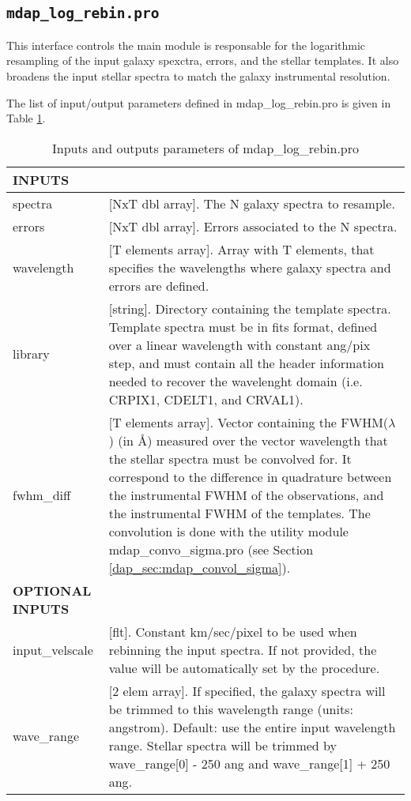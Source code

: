 \subsection{{\tt mdap\_log\_rebin.pro}}
\label{dap_sec:mdap_log_rebin}

This interface controls the main module is responsable for the
logarithmic resampling of the input galaxy spexctra, errors, and the
stellar templates. It also broadens the input stellar spectra to match
the galaxy instrumental resolution. 

The list of input/output parameters defined in mdap\_log\_rebin.pro is
given in Table \ref{dap_tab:mdap_log_rebin}.



\begin{center}
\begin{longtable}{p{2.7cm}| p{11.1cm}}
\caption{Inputs and outputs parameters of mdap\_log\_rebin.pro} \label{dap_tab:mdap_log_rebin} \\
\hline
\endfirsthead
\hline
\endhead
\hline
\endlastfoot
\hline
{\bf  INPUTS} &  \\
\hline
spectra   &   [NxT dbl array].  The N galaxy spectra to resample.\\
%
errors    &   [NxT dbl array].  Errors associated to the N spectra.\\
%
wavelength & [T elements array].     Array with T elements, that specifies the wavelengths where galaxy spectra and errors are defined.\\
%
library    &  [string].          Directory containing the template spectra. Template spectra must be in fits format, defined over a 
                             linear wavelength with constant ang/pix step, and must contain all the header information needed to  
                             recover the wavelenght domain (i.e. CRPIX1, CDELT1, and CRVAL1).\\
fwhm\_diff & [T elements array].  Vector containing the FWHM($\lambda$) (in \AA) measured over the vector wavelength that the stellar spectra must be
                               convolved for. It correspond to the difference in quadrature between the instrumental FWHM of the observations, 
                                 and the instrumental FWHM of the templates. The convolution is done with the utility module 
                                mdap\_convo\_sigma.pro (see Section \ref{dap_sec:mdap_convol_sigma}). \\
%
\hline
{\bf  OPTIONAL INPUTS} & \\
\hline
input\_velscale & [flt].    Constant km/sec/pixel to be used when rebinning the input spectra. If not provided, the value will be
                             automatically set by the procedure.\\
%
wave\_range  & [2 elem array].  If specified, the galaxy spectra will be trimmed to this wavelength range (units: angstrom). Default: 
                             use the entire input wavelength range. Stellar spectra will be trimmed by 
                             wave\_range[0] - 250 ang and wave\_range[1] + 250 ang.\\


\end{longtable}
\end{center}
